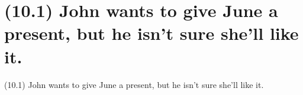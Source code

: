 \documentclass{article}
\begin{document}
\clearpage

%
%

\section*{(10.1) John wants to give June a present, but he isn't sure she’ll like it.}

\bigbreak
\begin{enumerate*}
\item[(10.1)] John wants to give June a present, but he isn't sure she’ll like it.
\end{enumerate*}
\bigbreak
\end{document}

